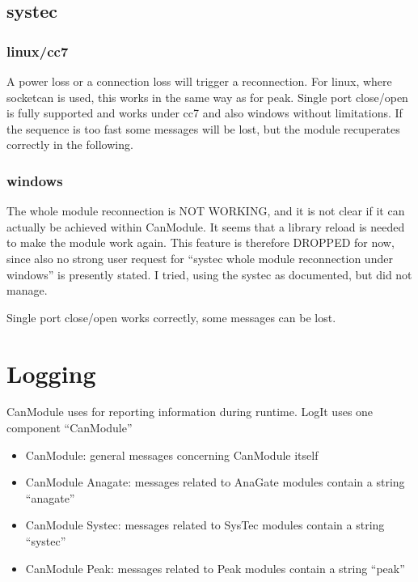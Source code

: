 \documentclass[a4paper,10pt,english]{sphinxmanual}
\begin{document}
\section{systec}
\label{\detokenize{reconnection:systec}}

\subsection{linux/cc7}
\label{\detokenize{reconnection:id1}}
A power loss or a connection loss will trigger a reconnection. For linux, where socketcan is used,
this works in the same way as for peak. Single port close/open is fully supported and works under
cc7 and also windows without limitations. If the sequence is too fast some messages will be lost, but the
module recuperates correctly in the following.


\subsection{windows}
\label{\detokenize{reconnection:id2}}
The whole module reconnection is NOT WORKING, and it is not clear if it can actually
be achieved within CanModule. It seems that a library reload is needed to make the module work again.
This feature is therefore DROPPED for now, since also no strong user request for “systec whole module reconnection
under windows” is presently stated. I tried, using the systec  as documented, but did not manage.

Single port close/open works correctly, some messages can be lost.


\chapter{Logging}
\label{\detokenize{logging:logging}}\label{\detokenize{logging::doc}}
CanModule uses  for reporting information during runtime. LogIt uses one component “CanModule”
\begin{itemize}
\item {} 
CanModule: general messages concerning CanModule itself

\item {} 
CanModule Anagate: messages related to AnaGate modules contain a string “anagate”

\item {} 
CanModule Systec: messages related to SysTec modules contain a string “systec”

\item {} 
CanModule Peak: messages related to Peak modules contain a string “peak”

\end{itemize}
\end{document}
